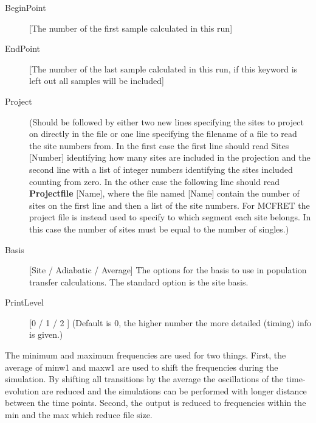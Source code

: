 \begin{description}
\item [BeginPoint] [The number of the first sample calculated in this run]
\item [EndPoint] [The number of the last sample calculated in this run, if this keyword is left out all samples will be included]
\item [Project] (Should be followed by either two new lines specifying the sites to project on directly in the file or one line specifying the filename of a file to read the site numbers from. In the first case the first line should read Sites [Number] identifying how many sites are included in the projection and the second line with a list of integer numbers identifying the sites included counting from zero. In the other case the following line should read \textbf{Projectfile} [Name], where the file named [Name] contain the number of sites on the first line and then a list of the site numbers. For MCFRET the project file is instead used to specify to which segment each site belongs. In this case the number of sites must be equal to the number of singles.)
\item[Basis] [Site / Adiabatic / Average] The options for the basis to use in population transfer calculations. The standard option is the site basis.
\item [PrintLevel] [0 / 1 / 2 ] (Default is 0, the higher number the more detailed (timing) info is given.)
\end{description}

The minimum and maximum frequencies are used for two things. First, the average of minw1 and maxw1 are used to shift the frequencies during the simulation. By shifting all transitions by the
average the oscillations of the time-evolution are reduced and the simulations can be performed with
longer distance between the time points. Second, the output is reduced to frequencies within the
min and the max which reduce file size.

